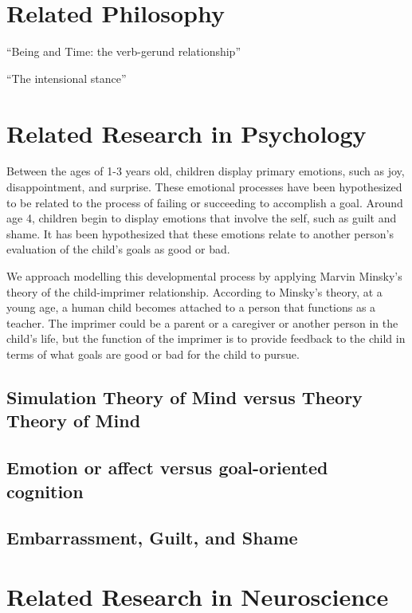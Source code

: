 \chapter{Related Philosophy}

``Being and Time: the verb-gerund relationship''

``The intensional stance''

\chapter{Related Research in Psychology}

Between the ages of 1-3 years old, children display primary emotions,
such as joy, disappointment, and surprise.  These emotional processes
have been hypothesized to be related to the process of failing or
succeeding to accomplish a goal.  Around age 4, children begin to
display emotions that involve the self, such as guilt and shame.  It
has been hypothesized that these emotions relate to another person's
evaluation of the child's goals as good or bad.

We approach modelling this developmental process by applying Marvin
Minsky's theory of the child-imprimer relationship.  According to
Minsky's theory, at a young age, a human child becomes attached to a
person that functions as a teacher.  The imprimer could be a parent or
a caregiver or another person in the child's life, but the function of
the imprimer is to provide feedback to the child in terms of what
goals are good or bad for the child to pursue.

\section{Simulation Theory of Mind versus Theory Theory of Mind}


\section{Emotion or affect versus goal-oriented cognition}


\section {Embarrassment, Guilt, and Shame}



\chapter{Related Research in Neuroscience}


